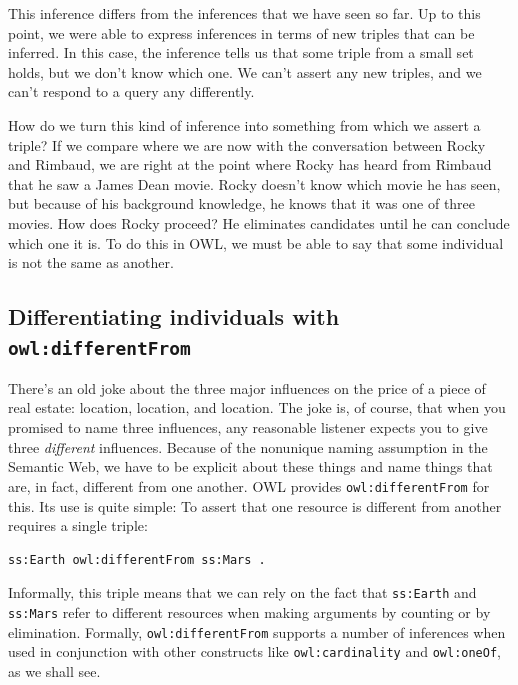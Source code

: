 This inference differs from the inferences that we have seen so far. Up
to this point, we were able to express inferences in terms of new
triples that can be inferred. In this case, the inference tells us that
some triple from a small set holds, but we don't know which one. We
can't assert any new triples, and we can't respond to a query any
differently.

How do we turn this kind of inference into something from which we
assert a triple? If we compare where we are now with the conversation
between Rocky and Rimbaud, we are right at the point where Rocky has
heard from Rimbaud that he saw a James Dean movie. Rocky doesn't know
which movie he has seen, but because of his background knowledge, he
knows that it was one of three movies. How does Rocky proceed? He
eliminates candidates until he can conclude which one it is. To do this
in OWL, we must be able to say that some individual is not the same as
another.

\subsection{Differentiating individuals with \texttt{owl:differentFrom}}

There's an old joke about the three major influences on the price of a
piece of real estate: location, location, and location. The joke is, of
course, that when you promised to name three influences, any reasonable
listener expects you to give three \emph{different} influences. Because of the
nonunique naming assumption in the Semantic Web, we have to be explicit
about these things and name things that are, in fact, different from one
another. OWL provides \texttt{owl:differentFrom} for this. Its use is quite
simple: To assert that one resource is different from another requires a
single triple:

\begin{lstlisting}
ss:Earth owl:differentFrom ss:Mars .
\end{lstlisting}

Informally, this triple means that we can rely on the fact that \texttt{ss:Earth}
and \texttt{ss:Mars} refer to different resources when making arguments by
counting or by elimination. Formally, \texttt{owl:differentFrom} supports a
number of inferences when used in conjunction with other constructs like
\texttt{owl:cardinality} and \texttt{owl:oneOf}, as we shall see.

